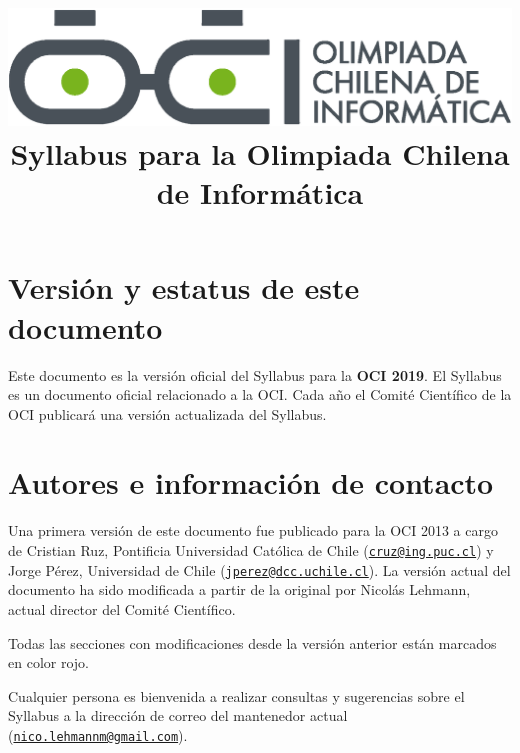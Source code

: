 \documentclass{article}
\newcommand{\new}{\color{red}}
\begin{document}
\title{
    \includegraphics[scale=0.2]{OCIlogo.eps}\\
    \vskip 20pt
    Syllabus para la Olimpiada Chilena de Informática}
\date{}
\maketitle

\section{Versión y estatus de este documento}
Este documento es la versión oficial del Syllabus para la \textbf{OCI 2019}.
El Syllabus es un documento oficial relacionado a la OCI.
Cada año el Comité Científico de la OCI publicará una versión actualizada del Syllabus.

\section{Autores e información de contacto}
Una primera versión de este documento fue publicado para la OCI 2013 a cargo de
Cristian Ruz, Pontificia Universidad Católica de Chile (\href{mailto:cruz@ing.puc.cl}{\nolinkurl{cruz@ing.puc.cl}}) y
Jorge Pérez, Universidad de Chile (\href{mailto:jperez@dcc.uchile.cl}{\nolinkurl{jperez@dcc.uchile.cl}}).
La versión actual del documento ha sido modificada a partir de la original por Nicolás Lehmann, actual director del Comité Científico.

{\new
  Todas las secciones con modificaciones desde la versión anterior están marcados en color rojo.
}

Cualquier persona es bienvenida a realizar consultas y sugerencias sobre el
Syllabus a la dirección de correo del mantenedor actual (\href{mailto:nico.lehmannm@gmail.com}{\nolinkurl{nico.lehmannm@gmail.com}}).
\end{document}
